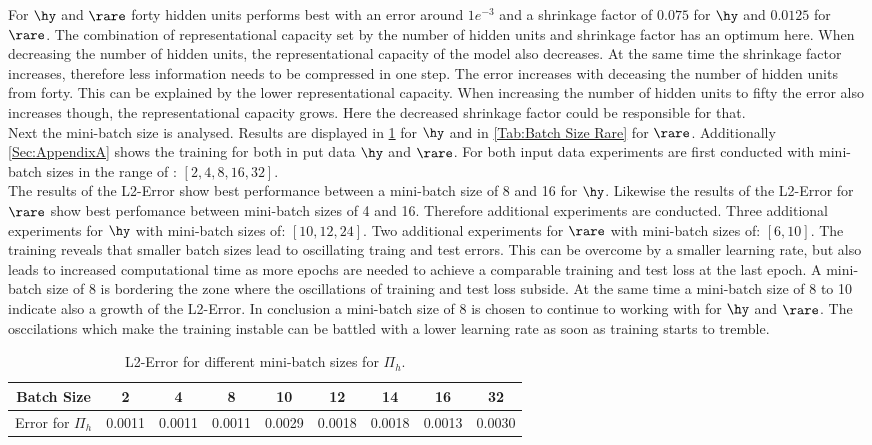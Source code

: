 For $\hy$ and $\rare$ forty hidden units performs best with an error around \(1e^{-3}\) and a shrinkage factor of \(0.075\) for $\hy$ and \(0.0125\) for $\rare$. The combination of representational capacity set by the number of hidden units and shrinkage factor has an optimum here.  When decreasing the number of hidden units, the representational capacity of the model also decreases. At the same time the shrinkage factor increases, therefore less information needs to be compressed in one step. The error increases with deceasing the number of hidden units from forty. This can be explained by the lower representational capacity. When increasing the number of hidden units to fifty the error also increases though, the representational capacity grows. Here the decreased shrinkage factor could be responsible for that.\\
Next the mini-batch size is analysed. Results are displayed in \cref{Tab:Batch Size Hydro} for $\hy$  and in \cref{Tab:Batch Size Rare} for $\rare$. Additionally \cref{Sec:AppendixA} shows the training for both in put data $\hy$ and $\rare$. For both input data experiments are first conducted with mini-batch sizes in the range of : \([2,4,8,16,32]\).\\ The results of the L2-Error show best performance between a mini-batch size of 8 and 16 for $\hy$. Likewise the results of the L2-Error for $\rare$ show best perfomance between mini-batch sizes of 4 and 16. Therefore additional experiments are conducted. Three additional experiments for $\hy$ with mini-batch sizes of: \([10,12,24]\). Two additional experiments for $\rare$ with mini-batch sizes of: \([6,10]\). The training reveals that smaller batch sizes lead to oscillating traing and test errors. This can be overcome by a smaller learning rate, but also leads to increased computational time as more epochs are needed to achieve a comparable training and test loss at the last epoch. A mini-batch size of 8 is bordering the zone where the oscillations of training and test loss subside. At the same time a mini-batch size of 8 to 10 indicate also a growth of the L2-Error. In conclusion a mini-batch size of 8 is chosen to continue to working with for $\hy$ and $\rare$. The osccilations which make the training instable can be battled with a lower learning rate as soon as training starts to tremble.\\
\begin{table}[!htbp]\centering
	\begin{tabular}{ |c|c|c|c|c|c|c|c|c| }
		\hline
		Batch Size & 2 & 4 & 8 & 10 & 12 & 14 & 16 & 32 \\ [.5ex]
		\hline
		Error for \(\Pi_h\) & 0.0011 & 0.0011 & 0.0011 & 0.0029 & 0.0018& 0.0018 & 0.0013 & 0.0030 \\ \hline
	\end{tabular}
	\caption{L2-Error for different mini-batch sizes for \(\Pi_h\).}
	\label{Tab:Batch Size Hydro}
\end{table}
